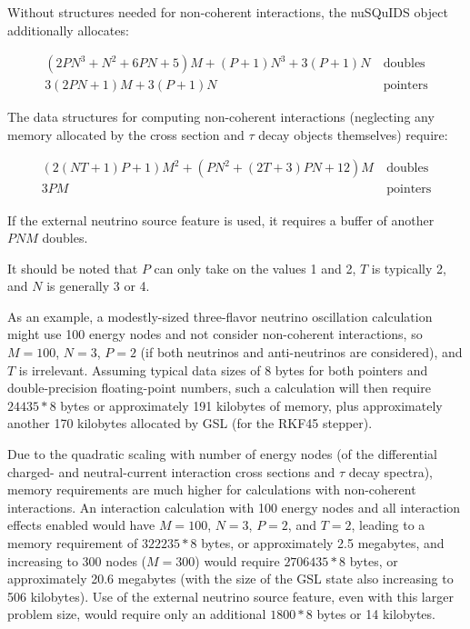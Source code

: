 \documentclass[3p,12pt]{elsarticle}
\newcommand{\ttf}{\ttfamily}
\begin{document}
Without structures needed for non-coherent interactions, the {\ttf nuSQuIDS} object additionally allocates:

\begin{subequations}
\label{eq:nusquids_memory}
\begin{align}
(2PN^3 + N^2 + 6PN + 5)M + (P+1)N^3 + 3(P+1)N &~\textrm{doubles}\\
3(2PN + 1)M + 3(P+1)N &~\textrm{pointers}
\end{align}
\end{subequations}

The data structures for computing non-coherent interactions (neglecting any memory allocated by the cross section and $\tau$ decay objects themselves) require:

\begin{subequations}
\label{eq:intereaction_memory}
\begin{align}
(2(NT+1)P + 1)M^2 + (PN^2 + (2T + 3)PN + 12)M &~\textrm{doubles}\\
3PM &~\textrm{pointers}
\end{align}
\end{subequations}

If the external neutrino source feature is used, it requires a buffer of another $PNM$ doubles. 

It should be noted that $P$ can only take on the values 1 and 2, $T$ is typically 2, and $N$ is generally 3 or 4. 

As an example, a modestly-sized three-flavor neutrino oscillation calculation might use 100 energy nodes and not consider non-coherent interactions, so $M=100$, $N=3$, $P=2$ (if both neutrinos and anti-neutrinos are considered), and $T$ is irrelevant. 
Assuming typical data sizes of 8 bytes for both pointers and double-precision floating-point numbers, such a calculation will then require $24435 * 8$ bytes or approximately 191 kilobytes of memory, plus approximately another 170 kilobytes allocated by GSL (for the RKF45 stepper). 

Due to the quadratic scaling with number of energy nodes (of the differential charged- and neutral-current interaction cross sections and $\tau$ decay spectra), memory requirements are much higher for calculations with non-coherent interactions. 
An interaction calculation with 100 energy nodes and all interaction effects enabled would have $M=100$, $N=3$, $P=2$, and $T=2$, leading to a memory requirement of $322235 * 8$ bytes, or approximately 2.5 megabytes, and increasing to 300 nodes ($M=300$) would require $2706435 * 8$ bytes, or approximately 20.6 megabytes (with the size of the GSL state also increasing to 506 kilobytes). 
Use of the external neutrino source feature, even with this larger problem size, would require only an additional $1800 * 8$ bytes or 14 kilobytes. 
\end{document}

